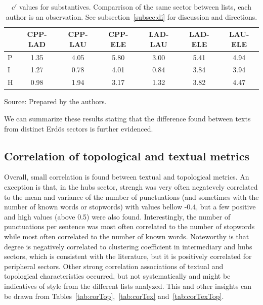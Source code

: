 \begin{table}
  \centering
  \caption{$c'$ values for substantives. Comparrison of the same sector between lists, each author is an observation. See subsection~\ref{subsec:di} for discussion and directions.}
    \small
\setlength{\tabcolsep}{.06667em}
  \begin{tabular}{|l|| c|c|c|c|c|c|}\hline
& CPP-LAD & CPP-LAU & CPP-ELE & LAD-LAU & LAD-ELE & LAU-ELE \\\hline
P & 1.35 & 4.05 & 5.80 & 3.00 & 5.41 & 4.94 \\\hline
I & 1.27 & 0.78 & 4.01 & 0.84 & 3.84 & 3.94 \\\hline
H & 0.98 & 1.94 & 3.17 & 1.32 & 3.82 & 4.47 \\\hline
  \end{tabular}
\begin{flushleft}
		Source: Prepared by the authors.\
\end{flushleft}
  \label{tab:kolSubInter}
\end{table}


We can summarize these results stating that the difference
found between texts from distinct Erd\"os sectors
is further evidenced.

\subsection{Correlation of topological and textual metrics}\label{subsec:cor}


Overall, small correlation is found between textual and topological metrics.
An exception is that, in the hubs sector, strengh was very often negatevely correlated to the mean and variance of the number
of punctuations (and sometimes with the number of known words or stopwords)
with values bellow -0.4, but a few positive and high values (above 0.5) were also found.
Interestingly, the number of punctuations per sentence was most often correlated to the number of stopwords
while most often correlated to the number of known words.
Noteworthy is that degree is negatively correlated to clustering coefficient in intermediary and hubs sectors,
which is consistent with the literature, but it is positively correlated for
peripheral sectors.
Other strong correlation associations of textual and topological characteristics occurred,
but not systematically and might be indicatives of style from the different lists analyzed.
This and other insights can be drawn from Tables~\ref{tab:corTop},~\ref{tab:corTex} and~\ref{tab:corTexTop}.

